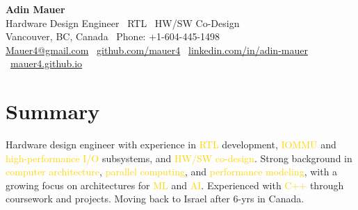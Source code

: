 \documentclass[11pt]{article}
\newcommand{\gold}[1]{\textcolor{gold}{#1}}
\begin{document}
\begin{center}
  {\LARGE \textbf{Adin Mauer}}\\
  Hardware Design Engineer \textbar\ RTL \textbar\ HW/SW Co-Design\\
  Vancouver, BC, Canada \textbar\ Phone: +1-604-445-1498\\
  \href{mailto:Mauer4@gmail.com}{Mauer4@gmail.com} \textbar\ \href{https://github.com/mauer4}{github.com/mauer4} \textbar\ \href{https://www.linkedin.com/in/adin-mauer-4774821a1/}{linkedin.com/in/adin-mauer} \textbar\ \href{https://mauer4.github.io/}{mauer4.github.io}
\end{center}

\section{Summary}
Hardware design engineer with experience in \gold{RTL} development, \gold{IOMMU} and \gold{high-performance I/O} subsystems, and \gold{HW/SW co-design}. Strong background in \gold{computer architecture}, \gold{parallel computing}, and \gold{performance modeling}, with a growing focus on architectures for \gold{ML} and \gold{AI}. Experienced with \gold{C++} through coursework and projects. Moving back to Israel after 6-yrs in Canada.
\end{document}
